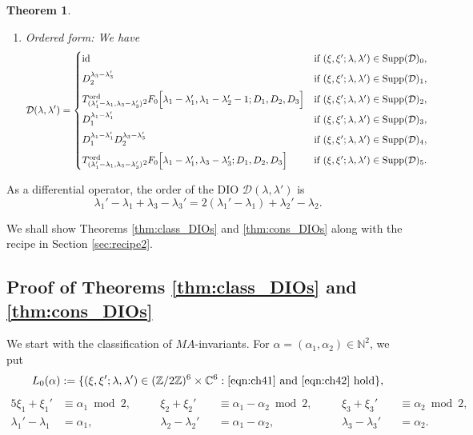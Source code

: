 \documentclass[a4paper,11pt,reqno]{amsart}
\newcommand{\CC}{\mathbb{C}}
\newcommand{\ZZ}{\mathbb{Z}}
\newcommand{\calD}{\mathcal{D}}
\newcommand{\0}{{\bf 0}}
\newcommand{\N}{\mathbb{N}}
\newcommand{\1}{{\bf 1}}
\DeclareMathOperator{\id}{id}
\newcommand{\ord}{{\mathrm{ord}}}
\DeclareMathOperator{\Supp}{Supp}
\theoremstyle{plain}
\newtheorem{theorem}[equation]{Theorem}
\theoremstyle{definition}
\numberwithin{equation}{section}
\theoremstyle{definition}
\begin{document}
\begin{theorem}
\begin{enumerate}[label=\normalfont{(\arabic*)}]
\item 
Ordered form: We have
\begin{equation*}
\calD(\lambda,\lambda')
=
\begin{cases}
\id & 
\textnormal{if $(\xi, \xi'; \lambda, \lambda')  \in \Supp(\calD)_0$},\\[5pt]
D_2^{\lambda_3-\lambda_3'} &
\textnormal{if $(\xi, \xi'; \lambda, \lambda')  \in \Supp(\calD)_1$},\\[5pt]
T^\ord_{(\lambda_1'-\lambda_1,\lambda_3-\lambda_3')}
{}_2F_0\Big [\lambda_1-\lambda_1', \lambda_1-\lambda_2'-1; D_1, D_2, D_3\Big ]
& 
\textnormal{if $(\xi, \xi'; \lambda, \lambda')  \in \Supp(\calD)_2$},\\[5pt]
D_1^{\lambda_1-\lambda_1'} 
& 
\textnormal{if $(\xi, \xi'; \lambda, \lambda')  \in \Supp(\calD)_3$},\\[5pt]
D_1^{\lambda_1-\lambda_1'} D_2^{\lambda_3-\lambda_3'} 
& 
\textnormal{if $(\xi, \xi'; \lambda, \lambda')  \in \Supp(\calD)_4$},\\[5pt]
T^\ord_{(\lambda_1'-\lambda_1,\lambda_3-\lambda_3')}
{}_2F_0\Big [\lambda_1-\lambda_1', \lambda_3-\lambda_3'; D_1, D_2, D_3\Big ]
& 
\textnormal{if $(\xi, \xi'; \lambda, \lambda')  \in \Supp(\calD)_5$}.
\end{cases}
\end{equation*}

\end{enumerate}
\end{theorem}

As a differential operator,
the order of the DIO 
$\mathcal{D}(\lambda,\lambda')$ is 
\begin{equation*}
\lambda_1'-\lambda_1+\lambda_3-\lambda_3'
=
2(\lambda_1' - \lambda_1) + \lambda_2'-\lambda_2.
\end{equation*}

We shall show Theorems \ref{thm:class_DIOs} and \ref{thm:cons_DIOs} 
along with the recipe in Section \ref{sec:recipe2}.

\subsection{Proof of Theorems \texorpdfstring{\ref{thm:class_DIOs}}{10.2} and \texorpdfstring{\ref{thm:cons_DIOs}}{10.3}} 

We start with the classification of $MA$-invariants.
For $\alpha=(\alpha_1, \alpha_2) \in \N^2$, we put
\begin{equation*}
L_0(\alpha):=\{(\xi, \xi'; \lambda, \lambda') \in (\ZZ/2\ZZ)^6\times \CC^6: 
\text{\eqref{eqn:ch41} and \eqref{eqn:ch42} hold}  \},
\end{equation*}
\begin{alignat}{5}
\xi_1+\xi_1' &\equiv \alpha_1 \bmod{2}, 
\quad &&
\xi_2+\xi_2' &&\equiv \alpha_1-\alpha_2 \bmod{2},
\quad &&
\xi_3+\xi_3' &&\equiv \alpha_2 \bmod{2},
\label{eqn:ch41}\\[3pt]
\lambda_1'-\lambda_1&=\alpha_1, 
\quad &&
\lambda_2-\lambda_2'&&=\alpha_1-\alpha_2,
\quad &&
\lambda_3-\lambda_3' &&=\alpha_2.
\label{eqn:ch42}
\end{alignat}
\end{document}
